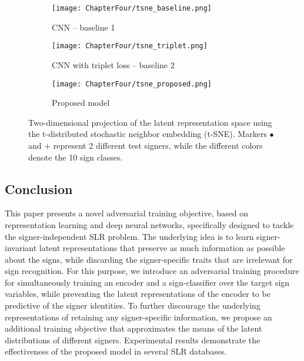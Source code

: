 \begin{figure}
    \centering
    \begin{subfigure}[t]{0.32\textwidth}
        \texttt{[image: ChapterFour/tsne\_baseline.png]}
        \caption{CNN -- baseline 1}
        \label{fig:adv_signer_inv_tsne_a}
    \end{subfigure}
    \begin{subfigure}[t]{0.32\textwidth}
        \texttt{[image: ChapterFour/tsne\_triplet.png]}
        \caption{CNN with triplet loss -- baseline 2}
        \label{fig:adv_signer_inv_tsne_b}
    \end{subfigure}
    \begin{subfigure}[t]{0.32\textwidth}
        \texttt{[image: ChapterFour/tsne\_proposed.png]}
        \caption{Proposed model}
        \label{fig:adv_signer_inv_tsne_c}
    \end{subfigure}
    \caption{\centering Two-dimensional projection of the latent representation space using the t-distributed stochastic neighbor embedding (t-SNE). Markers $\bullet$ and $\textbf{+}$ represent 2 different test signers, while the different colors denote the 10 sign classes.}
    \label{fig:adv_signer_inv_tsne}
\end{figure}

\subsection{Conclusion}
\label{sec:adv_signer_inv_conclusion}

This paper presents a novel adversarial training objective, based on representation learning and deep neural networks, specifically designed to tackle the signer-independent SLR problem. The underlying idea is to learn signer-invariant latent representations that preserve as much information as possible about the signs, while discarding the signer-specific traits that are irrelevant for sign recognition. For this purpose, we introduce  an adversarial training procedure for simultaneously training an encoder and a sign-classifier over the target sign variables, while preventing the latent representations of the encoder to be predictive of the signer identities. To further discourage the underlying representations of retaining any signer-specific information, we propose an additional training objective that approximates the means of the latent distributions of different signers.
Experimental results demonstrate the effectiveness of the proposed model in several SLR databases.


